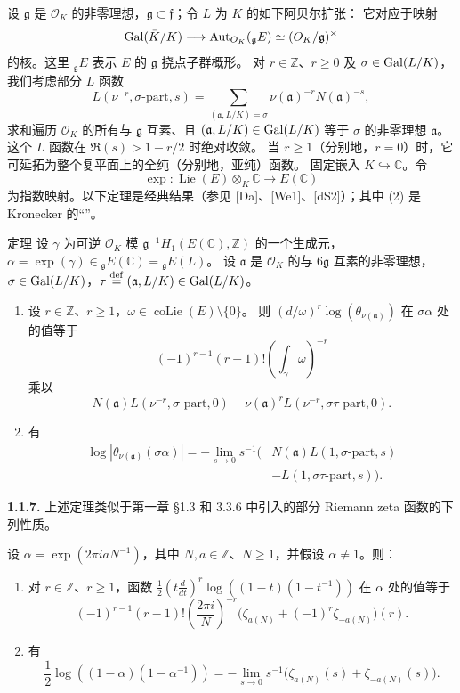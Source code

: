 设 $\mathfrak g$ 是 $\mathcal O_K$ 的非零理想，$\mathfrak g\subset\mathfrak f$；令 $L$ 为 $K$ 的如下阿贝尔扩张：
它对应于映射
\[
\operatorname{Gal}(\bar K/K)\longrightarrow\operatorname{Aut}_{O_K}({}_{\mathfrak g}E)
\simeq(O_K/\mathfrak g)^\times
\]
的核。这里 ${}_{\mathfrak g}E$ 表示 $E$ 的 $\mathfrak g$ 挠点子群概形。
对 $r\in\mathbb Z$、$r\geq0$ 及 $\sigma\in\operatorname{Gal}(L/K)$，我们考虑部分 $L$ 函数
\[
L(\nu^{-r},\sigma\text{-part},s)
=\sum_{(\mathfrak a,L/K)=\sigma}\nu(\mathfrak a)^{-r}N(\mathfrak a)^{-s},
\]
求和遍历 $\mathcal O_K$ 的所有与 $\mathfrak g$ 互素、且
$(\mathfrak a,L/K)\in\operatorname{Gal}(L/K)$ 等于 $\sigma$ 的非零理想 $\mathfrak a$。
这个 $L$ 函数在 $\Re(s)>1-r/2$ 时绝对收敛。
当 $r\geq1$（分别地，$r=0$）时，它可延拓为整个复平面上的全纯（分别地，亚纯）函数。
固定嵌入 $K\hookrightarrow\mathbb C$。令
\[
\exp:\operatorname{Lie}(E)\otimes_K\mathbb C\longrightarrow E(\mathbb C)
\]
为指数映射。以下定理是经典结果（参见 [Da]、[We1]、[dS2]）；其中 (2) 是 Kronecker
的“”。
\begin{statement}{定理}
设 $\gamma$ 为可逆 $\mathcal O_K$ 模 $\mathfrak g^{-1}H_1(E(\mathbb C),\mathbb Z)$ 的一个生成元，
$\alpha=\exp(\gamma)\in{}_{\mathfrak g}E(\mathbb C)={}_{\mathfrak g}E(L)$。
设 $\mathfrak a$ 是 $\mathcal O_K$ 的与 $6\mathfrak g$ 互素的非零理想，
$\sigma\in\operatorname{Gal}(L/K)$，$\tau\overset{\mathrm{def}}=(\mathfrak a,L/K)\in\operatorname{Gal}(L/K)$。
\begin{enumerate}[label=(\arabic*)]
\item 设 $r\in\mathbb Z$、$r\geq1$，$\omega\in\operatorname{coLie}(E)\setminus\{0\}$。
则 $(d/\omega)^r\log(\theta_{\nu(\mathfrak a)})$ 在 $\sigma\alpha$ 处的值等于
\[
(-1)^{r-1}(r-1)!\left(\int_\gamma\omega\right)^{-r}
\]
乘以
\[
N(\mathfrak a)L(\nu^{-r},\sigma\text{-part},0)
-\nu(\mathfrak a)^rL(\nu^{-r},\sigma\tau\text{-part},0).
\]
\item 有
\begin{align*}
\log\left|\theta_{\nu(\mathfrak a)}(\sigma\alpha)\right|
=-\lim_{s\to0}s^{-1}\bigl(&N(\mathfrak a)L(1,\sigma\text{-part},s)\\
&-L(1,\sigma\tau\text{-part},s)\bigr).
\end{align*}
\end{enumerate}
\end{statement}
\noindent\textbf{1.1.7.} 上述定理类似于第一章 §1.3 和 3.3.6 中引入的部分 Riemann zeta 函数的下列性质。

设 $\alpha=\exp(2\pi iaN^{-1})$，其中 $N,a\in\mathbb Z$、$N\geq1$，并假设 $\alpha\ne1$。则：
\begin{enumerate}[label=(\arabic*)]
\item 对 $r\in\mathbb Z$、$r\geq1$，函数
$\tfrac12(t\frac d{dt})^r\log((1-t)(1-t^{-1}))$ 在 $\alpha$ 处的值等于
\[
(-1)^{r-1}(r-1)!\left(\frac{2\pi i}{N}\right)^{-r}
\bigl(\zeta_{a(N)}+(-1)^r\zeta_{-a(N)}\bigr)(r).
\]
\item 有
\[
\frac12\log((1-\alpha)(1-\alpha^{-1}))
=-\lim_{s\to0}s^{-1}\bigl(\zeta_{a(N)}(s)+\zeta_{-a(N)}(s)\bigr).
\]
\end{enumerate}

